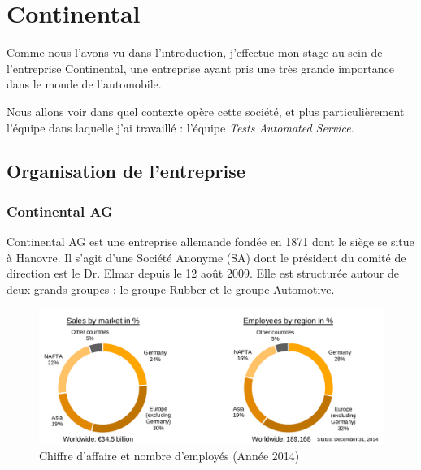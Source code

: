 \chapter{Continental}\label{chapConti}
\begin{figure}
\vspace{-25px}
\hspace{-30px}
\begin{minipage}{0.67\textwidth}
\minitoc
\end{minipage}
\end{figure}
Comme nous l'avons vu dans l'introduction, j'effectue mon stage au sein de l'entreprise Continental, une entreprise ayant pris une très grande importance dans le monde de l'automobile. 

Nous allons voir dans quel contexte opère cette société, et plus particulièrement l'équipe dans laquelle j'ai travaillé : l'équipe \textit{Tests Automated Service}.
	\section{Organisation de l'entreprise}
		\subsection{Continental AG}

Continental AG est une entreprise allemande fondée en 1871 dont le siège se situe à Hanovre. Il s'agit d'une Société Anonyme (SA) dont le président du comité de
direction est le Dr. Elmar  depuis le 12 août 2009. Elle est structurée autour de deux grands groupes : le groupe Rubber et le groupe Automotive.
	 
		 \begin{figure}[H]
		 	\centering
		 	\includegraphics[width=16cm]{contents/images/caConti.png}
		 	\caption{Chiffre d'affaire et nombre d'employés (Année 2014)}
		 	\label{fig:caConti}
		 \end{figure}

